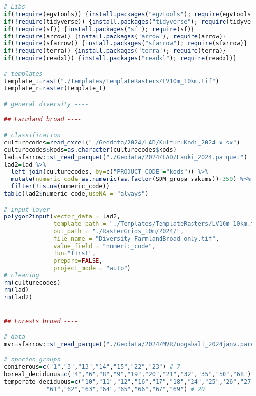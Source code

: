 \documentclass[
]{book}
\begin{document}
\begin{lstlisting}[language=R]
# Libs ----
if(!require(egvtools)) {install.packages("egvtools"); require(egvtools)}
if(!require(tidyverse)) {install.packages("tidyverse"); require(tidyverse)}
if(!require(sf)) {install.packages("sf"); require(sf)}
if(!require(arrow)) {install.packages("arrow"); require(arrow)}
if(!require(sfarrow)) {install.packages("sfarrow"); require(sfarrow)}
if(!require(terra)) {install.packages("terra"); require(terra)}
if(!require(readxl)) {install.packages("readxl"); require(readxl)}

# templates ----
template_t=rast("./Templates/TemplateRasters/LV10m_10km.tif")
template_r=raster(template_t)

# general diversity ----

## Farmland broad ----

# classification 
culturecodes=read_excel("./Geodata/2024/LAD/KulturuKodi_2024.xlsx")
culturecodes$kods=as.character(culturecodes$kods)
lad=sfarrow::st_read_parquet("./Geodata/2024/LAD/Lauki_2024.parquet")
lad2=lad %>% 
  left_join(culturecodes, by=c("PRODUCT_CODE"="kods")) %>% 
  mutate(numeric_code=as.numeric(as.factor(SDM_grupa_sakums))+350) %>% 
  filter(!is.na(numeric_code))
table(lad2$numeric_code,useNA = "always")

# input layer
polygon2input(vector_data = lad2,
              template_path = "./Templates/TemplateRasters/LV10m_10km.tif",
              out_path = "./RasterGrids_10m/2024/",
              file_name = "Diversity_FarmlandBroad_only.tif",
              value_field = "numeric_code",
              fun="first",
              prepare=FALSE,
              project_mode = "auto")
# cleaning
rm(culturecodes)
rm(lad)
rm(lad2)


## Forests broad ----

# data
mvr=sfarrow::st_read_parquet("./Geodata/2024/MVR/nogabali_2024janv.parquet")

# species groups
coniferous=c("1","3","13","14","15","22","23") # 7
boreal_deciduous=c("4","6","8","9","19","20","21","32","35","50","68") # 11
temperate_deciduous=c("10","11","12","16","17","18","24","25","26","27","28","29",
            "61","62","63","64","65","66","67","69") # 20


\end{lstlisting}
\end{document}
